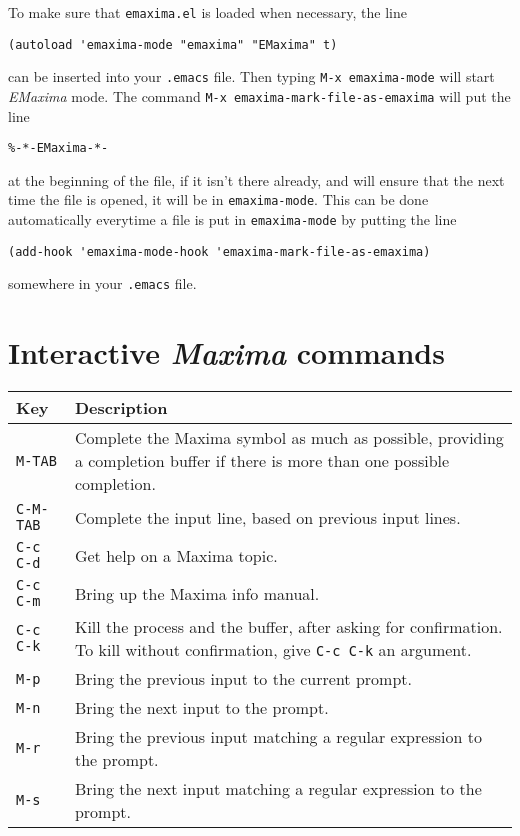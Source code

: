 \documentclass{article}
\newcommand{\emx}{\textsl{\sffamily EMaxima}}
\newcommand{\mx}{\textsl{\sffamily Maxima}}
\newcommand{\hyph}{-\hspace{0pt}}
\begin{document}
To make sure that \texttt{emaxima.el} is loaded when necessary, the line
\begin{verbatim}
(autoload 'emaxima-mode "emaxima" "EMaxima" t)
\end{verbatim}
\noindent
can be inserted into your \texttt{.emacs} file.  Then typing
\texttt{M-x emaxima\hyph{}mode} will start \emx{} mode.  The command 
\texttt{M-x emaxima\hyph{}mark\hyph{}file\hyph{}as\hyph{}emaxima} will put the line
\begin{verbatim}
%-*-EMaxima-*-
\end{verbatim}
\noindent
at the beginning of the file, if it isn't there already, and will ensure
that the next time the file is opened, it will be in \texttt{emaxima\hyph{}mode}.  
This can be done automatically everytime a file is put in
\texttt{emaxima\hyph{}mode} by putting the line
\begin{verbatim}
(add-hook 'emaxima-mode-hook 'emaxima-mark-file-as-emaxima)
\end{verbatim}
\noindent
somewhere in your \texttt{.emacs} file.

\section{Interactive \mx{} commands}
\label{app:intmx}

\smallskip

\begin{tabular}{p{\firstcol}p{\secondcol}}
\hline
\textbf{Key} & \textbf{Description}\\
\hline
\texttt{M-TAB} & Complete the Maxima symbol as much as possible, providing
     a completion buffer if there is more than one possible
     completion.\\
\texttt{C-M-TAB} & Complete the input line, based on previous input lines.\\
\texttt{C-c C-d} & Get help on a Maxima topic.\\
\texttt{C-c C-m} & Bring up the Maxima info manual.\\
\texttt{C-c C-k} & Kill the process and the buffer, after asking for
  confirmation.  To kill without confirmation, give \texttt{C-c C-k} an
  argument.\\
\texttt{M-p} & Bring the previous input to the current prompt.\\
\texttt{M-n} & Bring the next input to the prompt.\\
\texttt{M-r} & Bring the previous input matching
  a regular expression to the prompt.\\
\texttt{M-s} & Bring the next input matching
  a regular expression to the prompt.
\end{tabular}
\end{document}
